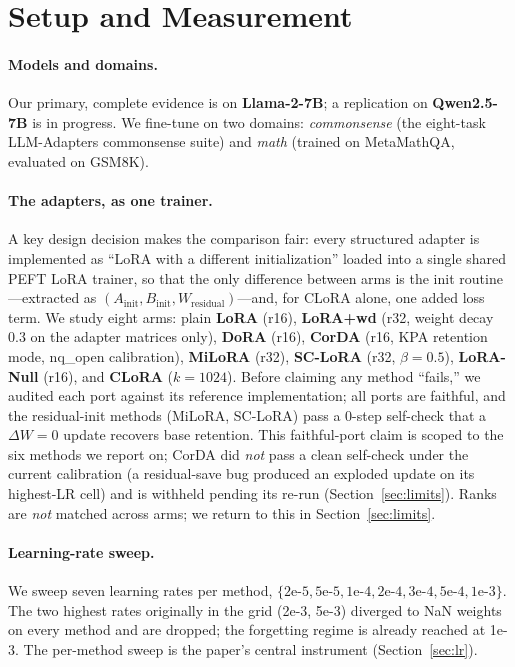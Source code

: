 \documentclass[11pt]{article}
\begin{document}
\section{Setup and Measurement}\label{sec:setup}
\paragraph{Models and domains.} Our primary, complete evidence is on
\textbf{Llama-2-7B}; a replication on \textbf{Qwen2.5-7B} is in progress. We fine-tune
on two domains: \emph{commonsense} (the eight-task LLM-Adapters commonsense suite) and
\emph{math} (trained on MetaMathQA, evaluated on GSM8K).

\paragraph{The adapters, as one trainer.} A key design decision makes the comparison
fair: every structured adapter is implemented as ``LoRA with a different
initialization'' loaded into a single shared PEFT LoRA trainer, so that the only
difference between arms is the init routine---extracted as $(A_{\text{init}},
B_{\text{init}}, W_{\text{residual}})$---and, for CLoRA alone, one added loss term. We
study eight arms: plain \textbf{LoRA} (r16), \textbf{LoRA{+}wd} (r32, weight decay
0.3 on the adapter matrices only), \textbf{DoRA} (r16), \textbf{CorDA} (r16, KPA
retention mode, nq\_open calibration), \textbf{MiLoRA} (r32), \textbf{SC-LoRA} (r32,
$\beta{=}0.5$), \textbf{LoRA-Null} (r16), and \textbf{CLoRA} ($k{=}1024$). Before
claiming any method ``fails,'' we audited each port against its reference
implementation; all ports are faithful, and the residual-init methods (MiLoRA, SC-LoRA)
pass a 0-step self-check that a $\Delta W = 0$ update recovers base retention. This
faithful-port claim is scoped to the six methods we report on; CorDA did \emph{not} pass
a clean self-check under the current calibration (a residual-save bug produced an exploded
update on its highest-LR cell) and is withheld pending its re-run
(Section~\ref{sec:limits}). Ranks are \emph{not} matched across arms; we return to this in
Section~\ref{sec:limits}.

\paragraph{Learning-rate sweep.} We sweep seven learning rates per method,
$\{2\text{e-}5, 5\text{e-}5, 1\text{e-}4, 2\text{e-}4, 3\text{e-}4, 5\text{e-}4,
1\text{e-}3\}$. The two highest rates originally in the grid (2e-3, 5e-3) diverged to
NaN weights on every method and are dropped; the forgetting regime is already reached at
1e-3. The per-method sweep is the paper's central instrument
(Section~\ref{sec:lr}).
\end{document}
